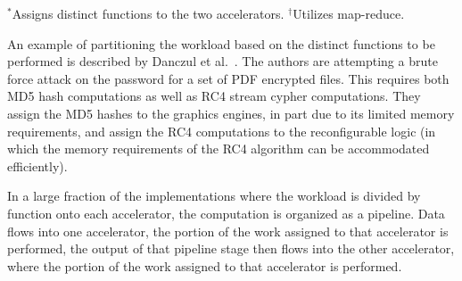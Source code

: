\begin{table}[htp]
$^*$Assigns distinct functions to the two accelerators. $^\dag$Utilizes map-reduce.
\end{table}

An example of partitioning the workload based on the distinct functions to be
performed is described by Danczul et al.~\cite{dfg+13}. The authors are
attempting a brute force attack on the password for a set of PDF encrypted
files.  This requires both MD5 hash computations as well as RC4 stream cypher 
computations.  They assign the MD5 hashes to the graphics engines, in part
due to its limited memory requirements, and assign the RC4 computations to the
reconfigurable logic (in which the memory requirements of the RC4 algorithm
can be accommodated efficiently).

In a large fraction of the implementations where the workload is
divided by function onto each accelerator, the computation is 
organized as a pipeline.  Data flows into one accelerator, the portion
of the work assigned to that accelerator is performed, the output
of that pipeline stage then flows into the other accelerator, where
the portion of the work assigned to that accelerator is performed.

